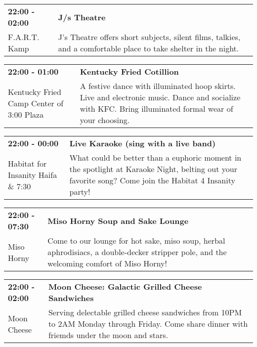 \begin{tabular}{ p{1in} p{2.2in} }
    \textbf{22:00 - 02:00} & \textbf{J/s Theatre} \\
    F.A.R.T. Kamp \newline  & J's Theatre offers short subjects, silent films, talkies, and a comfortable place to take shelter in the night. \\
    \hline 
\end{tabular}
    
\begin{tabular}{ p{1in} p{2.2in} }
    \textbf{22:00 - 01:00} & \textbf{Kentucky Fried Cotillion } \\
    Kentucky Fried Camp \newline Center of 3:00 Plaza & A festive dance with illuminated hoop skirts. Live and electronic music. Dance and socialize with KFC. Bring illuminated formal wear of your choosing. \\
    \hline 
\end{tabular}
    
\begin{tabular}{ p{1in} p{2.2in} }
    \textbf{22:00 - 00:00} & \textbf{Live Karaoke (sing with a live band)} \\
    Habitat for Insanity \newline Haifa \& 7:30 & What could be better than a euphoric moment in the spotlight at Karaoke Night, belting out your favorite song? Come join the Habitat 4 Insanity party! \\
    \hline 
\end{tabular}
    
\begin{tabular}{ p{1in} p{2.2in} }
    \textbf{22:00 - 07:30} & \textbf{Miso Horny Soup and Sake Lounge} \\
    Miso Horny \newline  & Come to our lounge for hot sake, miso soup, herbal aphrodisiacs, a double-decker stripper pole, and the welcoming comfort of Miso Horny! \\
    \hline 
\end{tabular}
    
\begin{tabular}{ p{1in} p{2.2in} }
    \textbf{22:00 - 02:00} & \textbf{Moon Cheese: Galactic Grilled Cheese Sandwiches} \\
    Moon Cheese \newline  & Serving delectable grilled cheese sandwiches from 10PM to 2AM Monday through Friday. Come share dinner with friemds under the moon and stars. \\
    \hline 
\end{tabular}
    
